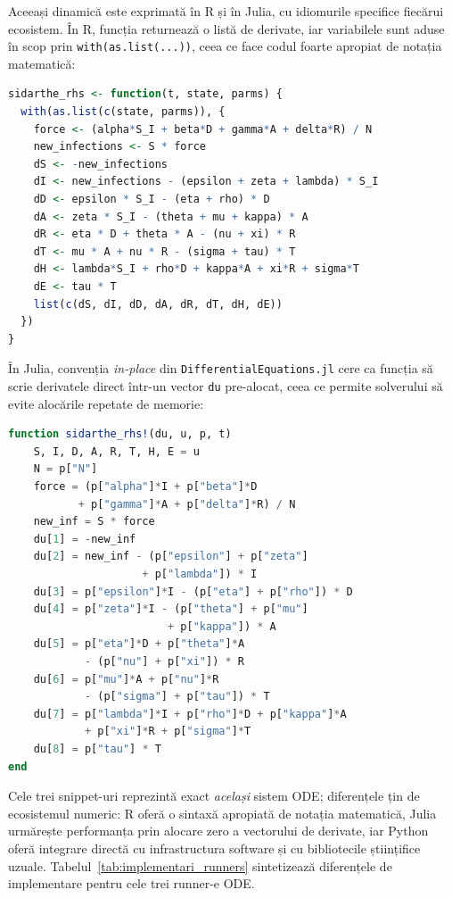 Aceeași dinamică este exprimată în R și în Julia, cu idiomurile specifice
fiecărui ecosistem. În R, funcția returnează o listă de derivate, iar variabilele
sunt aduse în scop prin \texttt{with(as.list(...))}, ceea ce face codul foarte
apropiat de notația matematică:
\begin{lstlisting}[language=R, caption={Funcția RHS SIDARTHE în runner-ul R (\texttt{deSolve}).}]
sidarthe_rhs <- function(t, state, parms) {
  with(as.list(c(state, parms)), {
    force <- (alpha*S_I + beta*D + gamma*A + delta*R) / N
    new_infections <- S * force
    dS <- -new_infections
    dI <- new_infections - (epsilon + zeta + lambda) * S_I
    dD <- epsilon * S_I - (eta + rho) * D
    dA <- zeta * S_I - (theta + mu + kappa) * A
    dR <- eta * D + theta * A - (nu + xi) * R
    dT <- mu * A + nu * R - (sigma + tau) * T
    dH <- lambda*S_I + rho*D + kappa*A + xi*R + sigma*T
    dE <- tau * T
    list(c(dS, dI, dD, dA, dR, dT, dH, dE))
  })
}
\end{lstlisting}

În Julia, convenția \emph{in-place} din \texttt{DifferentialEquations.jl} cere ca
funcția să scrie derivatele direct într-un vector \texttt{du} pre-alocat, ceea ce
permite solverului să evite alocările repetate de memorie:
\begin{lstlisting}[language=Julia, caption={Funcția RHS SIDARTHE în runner-ul Julia (\texttt{DifferentialEquations.jl}, convenție in-place).}]
function sidarthe_rhs!(du, u, p, t)
    S, I, D, A, R, T, H, E = u
    N = p["N"]
    force = (p["alpha"]*I + p["beta"]*D
           + p["gamma"]*A + p["delta"]*R) / N
    new_inf = S * force
    du[1] = -new_inf
    du[2] = new_inf - (p["epsilon"] + p["zeta"]
                     + p["lambda"]) * I
    du[3] = p["epsilon"]*I - (p["eta"] + p["rho"]) * D
    du[4] = p["zeta"]*I - (p["theta"] + p["mu"]
                         + p["kappa"]) * A
    du[5] = p["eta"]*D + p["theta"]*A
            - (p["nu"] + p["xi"]) * R
    du[6] = p["mu"]*A + p["nu"]*R
            - (p["sigma"] + p["tau"]) * T
    du[7] = p["lambda"]*I + p["rho"]*D + p["kappa"]*A
            + p["xi"]*R + p["sigma"]*T
    du[8] = p["tau"] * T
end
\end{lstlisting}

Cele trei snippet-uri reprezintă exact \emph{același} sistem ODE; diferențele
țin de ecosistemul numeric: R oferă o sintaxă apropiată de notația matematică,
Julia urmărește performanța prin alocare zero a vectorului de derivate, iar
Python oferă integrare directă cu infrastructura software și cu bibliotecile
științifice uzuale. Tabelul~\ref{tab:implementari_runners} sintetizează
diferențele de implementare pentru cele trei runner-e ODE.

